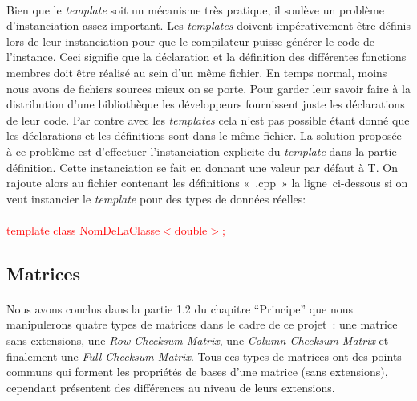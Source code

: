 \documentclass[a4paper,10pt]{report}
\begin{document}
\paragraph*{}
Bien que le \textit{template} soit un mécanisme très pratique, il soulève un problème d’instanciation assez important. 
Les \textit{templates} doivent impérativement être définis lors de leur instanciation pour que le compilateur puisse générer 
le code de l’instance. Ceci signifie que la déclaration et la définition des différentes fonctions membres doit être réalisé 
au sein d’un même fichier. En temps normal, moins nous avons de fichiers sources mieux on se porte. Pour garder leur savoir 
faire à la distribution d’une bibliothèque les développeurs fournissent juste les déclarations de leur code. Par contre 
avec les \textit{templates} cela n’est pas possible étant donné que les déclarations et les définitions sont dans le même 
fichier.\newline
La solution proposée à ce problème est d’effectuer l’instanciation explicite du \textit{template} dans la partie 
définition. Cette instanciation se fait en donnant une valeur par défaut à T. On rajoute alors au fichier contenant 
les définitions « .cpp » la ligne ci-dessous si on veut instancier le \textit{template} pour des types de données réelles:\paragraph*{}
\textcolor{red}{template class NomDeLaClasse$<$double$>$;}
\subsection{Matrices}
\paragraph*{}
Nous avons conclus dans la partie 1.2 du chapitre ``Principe'' que nous manipulerons quatre types de matrices dans le cadre 
de ce projet : 
une matrice sans extensions, une \textit{Row Checksum Matrix}, une \textit{Column Checksum Matrix} et finalement une 
\textit{Full Checksum Matrix}. Tous ces types de matrices ont des points communs qui forment les propriétés de bases 
d’une matrice (sans extensions), cependant présentent des différences au niveau de leurs extensions.
\end{document}
